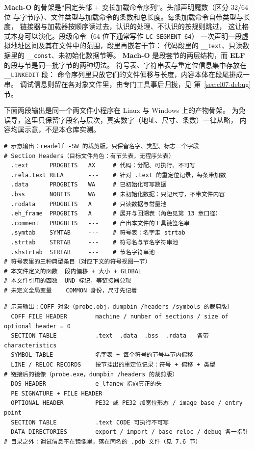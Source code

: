 \documentclass[12pt,a4paper,fontset=fandol]{ctexbook}
\newcommand{\Tp}[1]{\texttt{#1}}
\newcommand{\Mx}[1]{\textsf{#1}}
\newcommand{\Elf}{\textbf{\textsf{ELF}}}
\newcommand{\Macho}{\textbf{\textsf{Mach-O}}}
\newcommand{\Nix}{\textsf{Linux}}
\newcommand{\Win}{\textsf{Windows}}
\begin{document}
\Macho{} 的骨架是“固定头部 + 变长加载命令序列”。头部声明魔数（区分 32/64 位
与字节序）、文件类型与加载命令的条数和总长度。每条加载命令自带类型与长度，
链接器与加载器按顺序读过去，认识的处理、不认识的按规则跳过，
这让格式本身可以演化。段级命令（\Mx{64} 位下通常写作 \Tp{LC\_SEGMENT\_64}）
一次声明一段虚拟地址区间及其在文件中的范围，段里再嵌若干节：
代码段里的 \Tp{\_\_text}、只读数据里的 \Tp{\_\_const}、未初始化数据节等。
\Macho{} 是段套节的两层结构，而 \Elf{} 的段与节是同一批字节的两种切法。
符号表、字符串表与重定位信息集中存放在 \Tp{\_\_LINKEDIT} 段：
命令序列里只放它们的文件偏移与长度，内容本体在段尾排成一串。
调试信息则留在各对象文件里，由专门工具事后归拢，见 第~\ref{sec:cl07-debug} 节。

下面两段输出是同一个两文件小程序在 \Nix{} 与 \Win{} 上的产物骨架。
为免误导，这里只保留字段名与层次，真实数字（地址、尺寸、条数）一律从略，
内容均属示意，不是本仓库实测。

\begin{lstlisting}[style=outstyle, caption={示意：\Elf{} 可重定位文件的节头骨架（字段名层次，数值从略）}]
# 示意输出：readelf -SW 的裁剪版，只保留名字、类型、标志三个字段
# Section Headers（目标文件角色：有节头表，无程序头表）
  .text      PROGBITS   AX     # 代码：分配、可执行、不可写
  .rela.text RELA       ---    # 针对 .text 的重定位记录，每条带加数
  .data      PROGBITS   WA     # 已初始化可写数据
  .bss       NOBITS     WA     # 未初始化数据：只记尺寸，不带文件内容
  .rodata    PROGBITS   A      # 只读数据与常量池
  .eh_frame  PROGBITS   A      # 展开与回溯表（角色见第 13 章口径）
  .comment   PROGBITS   ---    # 产出本文件的工具链签名串
  .symtab    SYMTAB     ---    # 符号表：名字走 strtab
  .strtab    STRTAB     ---    # 符号名与节名字符串池
  .shstrtab  STRTAB     ---    # 节名字符串池
# 符号表里的三种典型条目（对应下文的符号视图一节）
# 本文件定义的函数  段内偏移 + 大小 + GLOBAL
# 本文件引用的函数  UND 标记，等链接器兑现
# 未定义全局变量    COMMON 身份，尺寸先记着
\end{lstlisting}

\begin{lstlisting}[style=outstyle, caption={示意：同一程序在 \Win{} 上的对象与镜像骨架对照（层次视图）}]
# 示意输出：COFF 对象（probe.obj，dumpbin /headers /symbols 的裁剪版）
  COFF FILE HEADER        machine / number of sections / size of optional header = 0
  SECTION TABLE           .text  .data  .bss  .rdata   各带 characteristics
  SYMBOL TABLE            名字表 + 每个符号的节号与节内偏移
  LINE / RELOC RECORDS    按节挂出的重定位记录：符号 + 偏移 + 类型
# 链接后的镜像（probe.exe，dumpbin /headers 的裁剪版）
  DOS HEADER              e_lfanew 指向真正的头
  PE SIGNATURE + FILE HEADER
  OPTIONAL HEADER         PE32 或 PE32 加宽位形态 / image base / entry point
  SECTION TABLE           .text CODE 可执行不可写
  DATA DIRECTORIES        export / import / base reloc / debug 各一指针
# 目录之外：调试信息不在镜像里，落在同名的 .pdb 文件（见 7.6 节）
\end{lstlisting}
\end{document}
